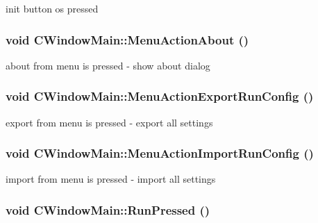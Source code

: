 \label{classCWindowMain_abd0c204fff950b8b26b0dc8bd7642afd}
init button os pressed \hypertarget{classCWindowMain_abeadaf48e9588743daf80d5ddcf3ceaa}{
\subsubsection[{MenuActionAbout}]{\setlength{\rightskip}{0pt plus 5cm}void CWindowMain::MenuActionAbout ()}}
\label{classCWindowMain_abeadaf48e9588743daf80d5ddcf3ceaa}
about from menu is pressed -\/ show about dialog \hypertarget{classCWindowMain_aa07e380e77b5dbcbecc1078f6ad1c41d}{
\subsubsection[{MenuActionExportRunConfig}]{\setlength{\rightskip}{0pt plus 5cm}void CWindowMain::MenuActionExportRunConfig ()}}
\label{classCWindowMain_aa07e380e77b5dbcbecc1078f6ad1c41d}
export from menu is pressed -\/ export all settings \hypertarget{classCWindowMain_afe2b8abc28c34267f4cf7bd5c87d97eb}{
\subsubsection[{MenuActionImportRunConfig}]{\setlength{\rightskip}{0pt plus 5cm}void CWindowMain::MenuActionImportRunConfig ()}}
\label{classCWindowMain_afe2b8abc28c34267f4cf7bd5c87d97eb}
import from menu is pressed -\/ import all settings \hypertarget{classCWindowMain_ac6aaa339ff3d4812de61092cc953c2ac}{
\subsubsection[{RunPressed}]{\setlength{\rightskip}{0pt plus 5cm}void CWindowMain::RunPressed ()}}
